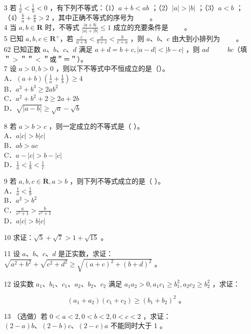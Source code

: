 \documentclass[10pt]{article}
\begin{document}
3 若 \(\frac{1}{a}<\frac{1}{b}<0\) ，有下列不等式：（1）\(a+b<a b\) ；（2）\(|a|>|b|\) ；（3）\(a<b\) ；（4）\(\frac{b}{a}+\frac{a}{b}>2\) ，其中正确不等式的序号为 \(\qquad\)。\\
4 当 \(a, b \in \mathbf{R}\) 时，不等式 \(\frac{|a+b|}{|a|+|b|} \leqslant 1\) 成立的充要条件是 \(\qquad\)。\\
5 已知 \(a, b, c \in \mathbf{R}^{+}\)，若 \(\frac{c}{a+b}<\frac{a}{b+c}<\frac{b}{c+a}\) ，则 \(a 、 b 、 c\) 由大到小排列为 \(\qquad\)。\\
62 已知正数 \(a 、 b 、 c 、 d\) 满足 \(a+d=b+c,|a-d|<|b-c|\) ，则 \(a d\) \(\qquad\) \(b c\)（填＂\(>\)＂＂\(<\)＂或＂＝＂）。\\
7 设 \(a>0, b>0\) ，则以下不等式中不恒成立的是（）。\\
A．\((a+b)\left(\frac{1}{a}+\frac{1}{b}\right) \geqslant 4\)\\
B．\(a^{3}+b^{3} \geqslant 2 a b^{2}\)\\
C．\(a^{2}+b^{2}+2 \geqslant 2 a+2 b\)\\
D．\(\sqrt{|a-b|} \geqslant \sqrt{a}-\sqrt{b}\)

8 若 \(a>b>c\) ，则一定成立的不等式是（ ）。\\
A．\(a|c|>b|c|\)\\
B．\(a b>a c\)\\
C．\(a-|c|>b-|c|\)\\
D．\(\frac{1}{a}<\frac{1}{b}<\frac{1}{c}\)

9 若 \(a, b, c \in \mathbf{R}, a>b\) ，则下列不等式成立的是（ ）。\\
A．\(\frac{1}{a}<\frac{1}{b}\)\\
B．\(a^{2}>b^{2}\)\\
C．\(\frac{a}{c^{2}+1}>\frac{b}{c^{2}+1}\)\\
D．\(a|c|>b|c|\)

10 求证：\(\sqrt{5}+\sqrt{7}>1+\sqrt{15}\) 。

11 设 \(a 、 b 、 c 、 d\) 是正实数，求证：\(\sqrt{a^{2}+b^{2}}+\sqrt{c^{2}+d^{2}} \geqslant \sqrt{(a+c)^{2}+(b+d)^{2}}\) 。

12 设实数 \(a_{1} 、 b_{1} 、 c_{1} 、 a_{2} 、 b_{2} 、 c_{2}\) 满足 \(a_{1} a_{2}>0, a_{1} c_{1} \geqslant b_{1}^{2}, a_{2} c_{2} \geqslant b_{2}^{2}\) ，求证：

\[
\left(a_{1}+a_{2}\right)\left(c_{1}+c_{2}\right) \geqslant\left(b_{1}+b_{2}\right)^{2} \text { 。 }
\]

13 （选做）若 \(0<a<2,0<b<2,0<c<2\) ，求证：\((2-a) b 、(2-b) c 、(2-c) a\) 不能同时大于 1 。
\end{document}

